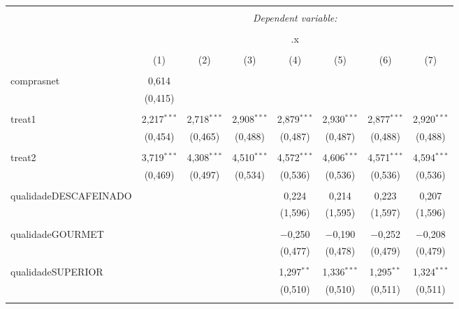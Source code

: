 
\begin{table}[!htbp] \centering 
  \caption{} 
  \label{} 
\begin{tabular}{@{\extracolsep{5pt}}lccccccc} 
\\[-1.8ex]\hline 
\hline \\[-1.8ex] 
 & \multicolumn{7}{c}{\textit{Dependent variable:}} \\ 
\cline{2-8} 
\\[-1.8ex] & \multicolumn{7}{c}{.x} \\ 
\\[-1.8ex] & (1) & (2) & (3) & (4) & (5) & (6) & (7)\\ 
\hline \\[-1.8ex] 
 comprasnet & 0,614 &  &  &  &  &  &  \\ 
  & (0,415) &  &  &  &  &  &  \\ 
  & & & & & & & \\ 
 treat1 & 2,217$^{***}$ & 2,718$^{***}$ & 2,908$^{***}$ & 2,879$^{***}$ & 2,930$^{***}$ & 2,877$^{***}$ & 2,920$^{***}$ \\ 
  & (0,454) & (0,465) & (0,488) & (0,487) & (0,487) & (0,488) & (0,488) \\ 
  & & & & & & & \\ 
 treat2 & 3,719$^{***}$ & 4,308$^{***}$ & 4,510$^{***}$ & 4,572$^{***}$ & 4,606$^{***}$ & 4,571$^{***}$ & 4,594$^{***}$ \\ 
  & (0,469) & (0,497) & (0,534) & (0,536) & (0,536) & (0,536) & (0,536) \\ 
  & & & & & & & \\ 
 qualidadeDESCAFEINADO &  &  &  & 0,224 & 0,214 & 0,223 & 0,207 \\ 
  &  &  &  & (1,596) & (1,595) & (1,597) & (1,596) \\ 
  & & & & & & & \\ 
 qualidadeGOURMET &  &  &  & $-$0,250 & $-$0,190 & $-$0,252 & $-$0,208 \\ 
  &  &  &  & (0,477) & (0,478) & (0,479) & (0,479) \\ 
  & & & & & & & \\ 
 qualidadeSUPERIOR &  &  &  & 1,297$^{**}$ & 1,336$^{***}$ & 1,295$^{**}$ & 1,324$^{***}$ \\ 
  &  &  &  & (0,510) & (0,510) & (0,511) & (0,511) \\ 
  & & & & & & & \\ 

\end{tabular}
\end{table}
